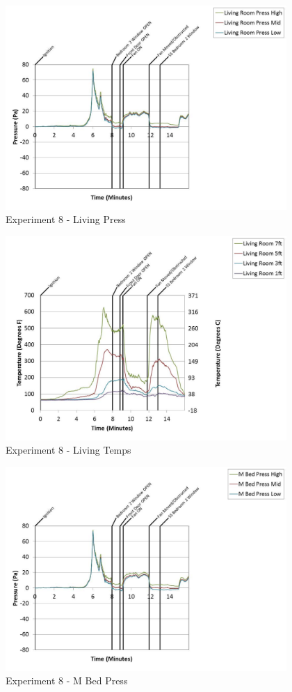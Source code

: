 \documentclass{article}
\begin{document}
\begin{appendices}
	\begin{figure}[h!]
		\centering
		\includegraphics[height=3.05in]{0_Images/Results_Charts/Exp_8_Charts/LivingPress.pdf}
		\caption{Experiment 8 - Living Press}
	\end{figure}
 
	\clearpage

	\begin{figure}[h!]
		\centering
		\includegraphics[height=3.05in]{0_Images/Results_Charts/Exp_8_Charts/LivingTemps.pdf}
		\caption{Experiment 8 - Living Temps}
	\end{figure}
 

	\begin{figure}[h!]
		\centering
		\includegraphics[height=3.05in]{0_Images/Results_Charts/Exp_8_Charts/MBedPress.pdf}
		\caption{Experiment 8 - M Bed Press}
	\end{figure}
 

\end{appendices}
\end{document}
